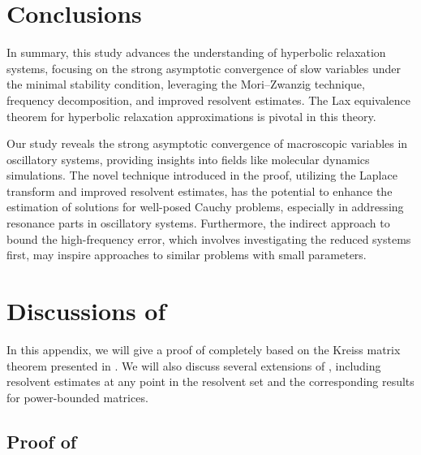 \documentclass{article}
\theoremstyle{plain}%
\theoremstyle{definition}%
\theoremstyle{remark}%
\newcommand{\+}[1]{{\bm{#1}}}
\begin{document}
\section{Conclusions}
\label{sec:concl}
In summary, this study advances the 
understanding of hyperbolic relaxation systems, focusing on the 
strong asymptotic convergence of slow variables under 
the minimal stability condition, leveraging the Mori--Zwanzig 
technique, frequency decomposition, and improved resolvent estimates. 
The Lax equivalence theorem for hyperbolic relaxation approximations 
is pivotal in this theory.

Our study reveals the strong asymptotic convergence of 
macroscopic variables in oscillatory systems, providing insights into 
fields like molecular dynamics simulations. 
The novel technique introduced in the proof, utilizing the Laplace 
transform and improved resolvent estimates, has the potential to 
enhance the estimation of solutions for well-posed Cauchy problems, 
especially in addressing resonance parts in oscillatory systems. 
Furthermore, the indirect approach to bound the high-frequency 
error, which involves investigating the reduced systems first, may 
inspire approaches to similar problems with small parameters.



\appendix
\section{Discussions of }
\label{app:kreiss}
In this appendix, we will give a proof of  completely 
based on the Kreiss matrix theorem presented in .
We will also discuss several extensions of , including 
resolvent estimates at any point in the resolvent set and the 
corresponding results for power-bounded matrices.


\subsection{Proof of }
\end{document}
